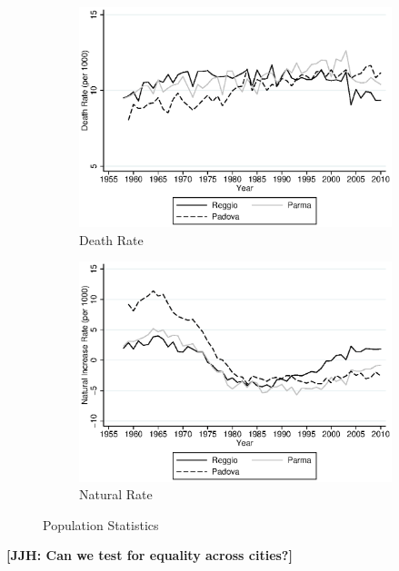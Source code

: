 \begin{figure}[H]
\begin{subfigure}[t]{0.49\textwidth}
          \includegraphics[width=\textwidth]{../../output/image/death_rate.eps}
        \caption{Death Rate}
        \end{subfigure}
        \begin{subfigure}[t]{0.49\textwidth}
          \includegraphics[width=\textwidth]{../../output/image/naturalinc_rate.eps}
            \caption{Natural Rate}
        \end{subfigure}
      \caption{Population Statistics}  \label{fig:population}
    \end{figure}

\textbf{[JJH: Can we test for equality across cities?]}

